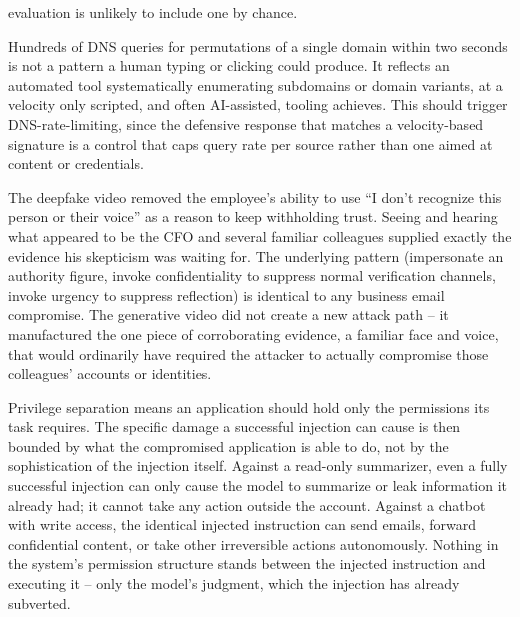 \begin{answerkey}
evaluation is unlikely to include one by chance.
\item Hundreds of DNS queries for permutations of a single domain within two seconds is not a
pattern a human typing or clicking could produce. It reflects an automated tool systematically
enumerating subdomains or domain variants, at a velocity only scripted, and often AI-assisted,
tooling achieves. This should trigger DNS-rate-limiting, since the defensive response that matches
a velocity-based signature is a control that caps query rate per source rather than one aimed at
content or credentials.
\item The deepfake video removed the employee's ability to use ``I don't recognize this person or
their voice'' as a reason to keep withholding trust. Seeing and hearing what appeared to be the
CFO and several familiar colleagues supplied exactly the evidence his skepticism was waiting for.
The underlying pattern (impersonate an authority figure, invoke confidentiality to suppress normal
verification channels, invoke urgency to suppress reflection) is identical to any business email
compromise. The generative video did not create a new attack path -- it manufactured the one piece
of corroborating evidence, a familiar face and voice, that would ordinarily have required the
attacker to actually compromise those colleagues' accounts or identities.
\item Privilege separation means an application should hold only the permissions its task
requires. The specific damage a successful injection can cause is then bounded by what the
compromised application is able to do, not by the sophistication of the injection itself. Against
a read-only summarizer, even a fully successful injection can only cause the model to summarize
or leak information it already had; it cannot take any action outside the account. Against a
chatbot with write access, the identical injected instruction can send emails, forward
confidential content, or take other irreversible actions autonomously. Nothing in the system's
permission structure stands between the injected instruction and executing it -- only the model's
judgment, which the injection has already subverted.
\end{answerkey}

